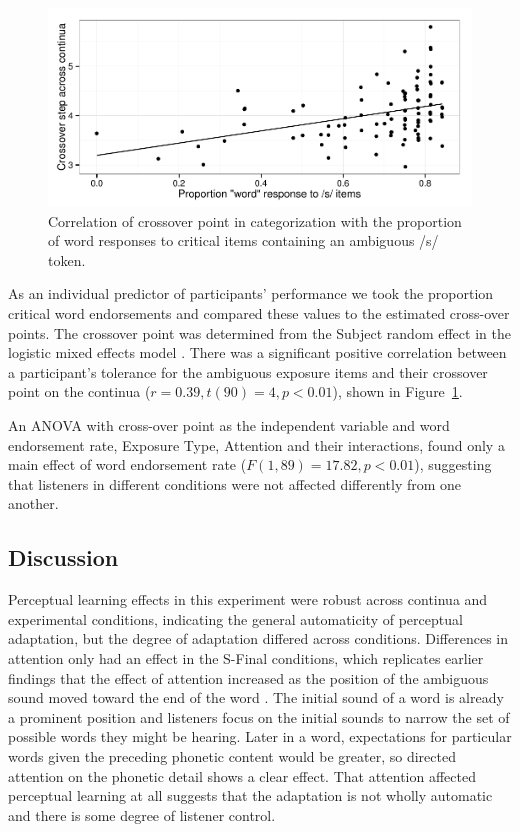 \begin{figure}[!ht]

\caption{Correlation of crossover point in categorization with the proportion of word responses to critical items containing an ambiguous /s/ token.}\label{fig:exp1xover}
\begin{center}
\includegraphics[width=\textwidth]{graphs/exp1_xoverwordresp}
\end{center}
\end{figure}

As an individual predictor of participants' performance we took the proportion critical word endorsements and compared these values to the estimated cross-over points. 
The crossover point was determined from the Subject random effect in the logistic mixed effects model \citep{Kleber2011}. 
There was a significant positive correlation between a participant's tolerance for the ambiguous exposure items and their crossover point on the continua ($r = 0.39, t (90) = 4, p < 0.01$), shown in Figure~\ref{fig:exp1xover}.

An ANOVA with cross-over point as the independent variable and word endorsement rate, Exposure Type, Attention and their interactions, found only a main effect of word endorsement rate ($F(1,89) = 17.82, p < 0.01$), suggesting that listeners in different conditions were not affected differently from one another.

\subsection{Discussion}

Perceptual learning effects in this experiment were robust across continua and experimental conditions, indicating the general automaticity of perceptual adaptation, but the degree of adaptation differed across conditions. 
Differences in attention only had an effect in the S-Final conditions, which replicates earlier findings that the effect of attention increased as the position of the ambiguous sound moved toward the end of the word \cite{Pitt2012}.  
The initial sound of a word is already a prominent position and listeners focus on the initial sounds to narrow the set of possible words they might be hearing. Later in a word, expectations for particular words given the preceding phonetic content would be greater, so directed attention on the phonetic detail shows a clear effect.  
That attention affected perceptual learning at all suggests that the adaptation is not wholly automatic and there is some degree of listener control.

